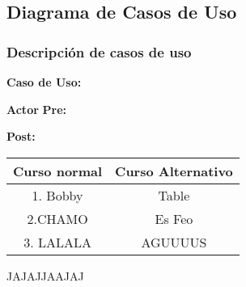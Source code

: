 \subsection{Diagrama de Casos de Uso}




\subsubsection{Descripción de casos de uso}

\textbf{Caso de Uso:}

\textbf{Actor}
\textbf{Pre:}

\textbf{Post:}
\begin{table}[h!]
	\begin{center}
	
 \begin{tabular}{|c | c|} 
 \hline
 \textbf{Curso normal} & \textbf{Curso Alternativo} \\
 \hline
 \hline
 1. Bobby & Table \\
 \hline
 2.CHAMO & Es Feo \\
 \hline
 3. LALALA & AGUUUUS \\
 \end{tabular}
 
	\end{center}
\end{table}
 
 JAJAJJAAJAJ
